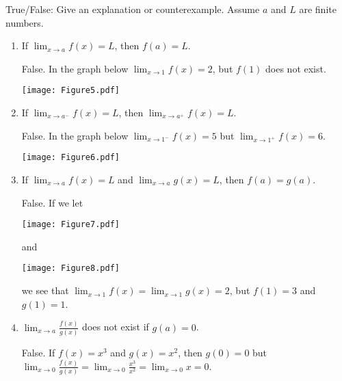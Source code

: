 \documentclass[handout,nooutcomes]{ximera}
\begin{document}
	
	
	

\begin{problem}
True/False:  Give an explanation or counterexample.  Assume $a$ and $L$ are finite numbers.
	
			\begin{enumerate}
			
			\item  If $ \lim_{x \to a} f(x) = L$, then $f(a) = L$.
			\begin{freeResponse}
			False.  In the graph below $ \lim_{x \to 1} f(x) = 2 $, but $f(1)$ does not exist.
			
				\begin{image}
				\texttt{[image: Figure5.pdf]}
				\end{image}
			\end{freeResponse}
			
			
			
			\item  If $  \lim_{x \to a^-} f(x) = L$, then $  \lim_{x \to a^+} f(x) = L $.
			\begin{freeResponse}
			False.  In the graph below $ \lim_{x \to 1^-} f(x) = 5$ but $ \lim_{x \to 1^+} f(x) = 6$.
			
				\begin{image}
				\texttt{[image: Figure6.pdf]}
				\end{image}
			\end{freeResponse}
			
			
			
			\item  If $ \lim_{x \to a} f(x) = L $ and $  \lim_{x \to a} g(x) = L $, then $f(a) = g(a)$.
			\begin{freeResponse}
			 False.  If we let 
			 
			 	\begin{image}
			 	\texttt{[image: Figure7.pdf]}
			 	\end{image}
			 	
			and
			
				\begin{image}
				\texttt{[image: Figure8.pdf]}
				\end{image}
				
			 we see that $ \lim_{x \to 1} f(x) = \lim_{x \to 1} g(x) = 2$, but $f(1) = 3$ and $g(1) = 1$.
			\end{freeResponse}
			
			
			
			\item  $ \lim_{x \to a} \frac{f(x)}{g(x)} $ does not exist if $g(a) = 0$.
			\begin{freeResponse}
			False.  If $f(x) = x^3$ and $g(x) = x^2$, then $g(0) = 0$ but $ \lim_{x \to 0} \frac{f(x)}{g(x)} = \lim_{x \to 0} \frac{x^3}{x^2} = \lim_{x \to 0} x = 0$.  
			\end{freeResponse}
			
			
			
			\end{enumerate}
\end{problem}
	










								
				
				
\end{document}
